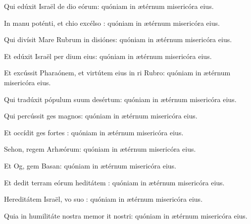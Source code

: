 \item {}

\item Qui edúxit Israël de dio eórum:\psstar{} quóniam in ætérnum misericóra eius.

\item In manu poténti, et chio excélso :\psstar{} quóniam in ætérnum misericóra eius.

\item Qui divísit Mare Rubrum in disiónes:\psstar{} quóniam in ætérnum misericóra eius.

\item Et edúxit Israël per dium eius:\psstar{} quóniam in ætérnum misericóra eius.

\item Et excússit Pharaónem, et virtútem eius in ri Rubro:\psstar{} quóniam in ætérnum misericóra eius.

\item Qui tradúxit pópulum suum  desértum:\psstar{} quóniam in ætérnum misericóra eius.

\item Qui percússit ges magnos:\psstar{} quóniam in ætérnum misericóra eius.

\item Et occídit ges fortes :\psstar{} quóniam in ætérnum misericóra eius.

\item Sehon, regem Arhæórum:\psstar{} quóniam in ætérnum misericóra eius.

\item Et Og, gem Basan:\psstar{} quóniam in ætérnum misericóra eius.

\item Et dedit terram eórum heditátem :\psstar{} quóniam in ætérnum misericóra eius.

\item Hereditátem Israël, vo suo :\psstar{} quóniam in ætérnum misericóra eius.

\item Quia in humilitáte nostra memor it nostri:\psstar{} quóniam in ætérnum misericóra eius.

